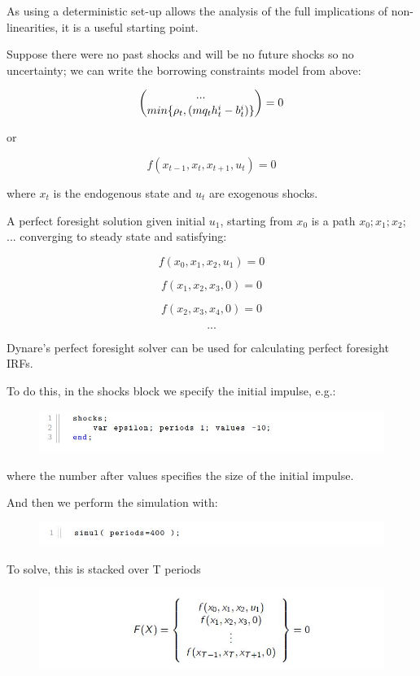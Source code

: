 \documentclass[10pt,math=newtx,citestyle=gb7714-2015,bibstyle=gb7714-2015]{elegantbook}
\begin{document}
{As using a deterministic set-up allows the analysis of the full implications of non-linearities, it is a useful starting point.

Suppose there were no past shocks and will be no future shocks so no uncertainty; we can write the borrowing constraints model from above:

$$\dbinom{...}{min\{\rho_t,(mq_th_t^i-b_t^i)\}}=0$$

or

$$f(x_{t-1},x_t,x_{t+1},u_t)=0$$

where $x_t$ is the endogenous state and $u_t$ are exogenous shocks.

A perfect foresight solution given initial $u_1$, starting from $x_0$ is a path $x_0; x_1; x_2;$ ... converging to steady state and satisfying:

$$f(x_0,x_1,x_2,u_1)=0$$

$$f(x_1,x_2,x_3,0)=0$$

$$f(x_2,x_3,x_4,0)=0$$

$$...$$

Dynare's perfect foresight solver can be used for calculating perfect foresight IRFs.

To do this, in the shocks block we specify the initial impulse, e.g.:

\begin{figure}[htbp!]
	\centering
	\includegraphics[width=0.8\linewidth]{FIG/extendpath}
	\centering
\end{figure}

where the number after values specifies the size of the initial impulse.

And then we perform the simulation with:

\begin{figure}[htbp!]
	\centering
	\includegraphics[width=0.8\linewidth]{FIG/runsimul}
	\centering
\end{figure}

To solve, this is stacked over T periods

\begin{figure}[htbp!]
	\centering
	\includegraphics[width=0.8\linewidth]{FIG/equationsexpath}
	\centering
\end{figure}

}
\end{document}
